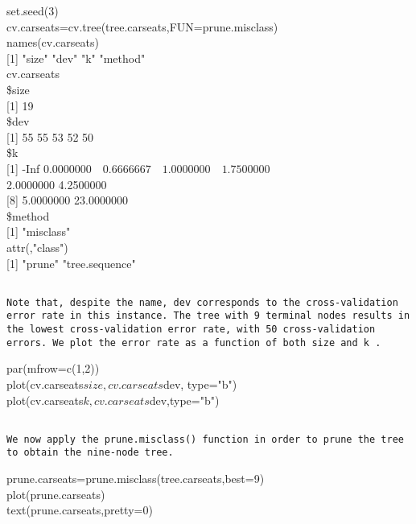 \documentclass[10pt]{article}
\begin{document}
\begin{displayquote}
set.seed(3)\\
cv.carseats=cv.tree(tree.carseats,FUN=prune.misclass)\\
names(cv.carseats)\\[0pt]
[1] "size" "dev" "k" "method"\\
cv.carseats\\
\$size\\[0pt]
[1] 19\\
\$dev\\[0pt]
[1] 55 55 53 52 50\\
\$k\\[0pt]
[1] -Inf $0.0000000 \quad 0.6666667 \quad 1.0000000 \quad 1.7500000$\\
2.0000000 4.2500000\\[0pt]
[8] 5.0000000 23.0000000\\
\$method\\[0pt]
[1] "misclass"\\
attr(,"class")\\[0pt]
[1] "prune" "tree.sequence"
\end{displayquote}

\begin{verbatim}

Note that, despite the name, dev corresponds to the cross-validation error rate in this instance. The tree with 9 terminal nodes results in the lowest cross-validation error rate, with 50 cross-validation errors. We plot the error rate as a function of both size and k .
\end{verbatim}

\begin{displayquote}
par(mfrow=c(1,2))\\
plot(cv.carseats$size,cv.carseats$dev, type="b")\\
plot(cv.carseats$k,cv.carseats$dev,type="b")

\end{displayquote}

\begin{verbatim}

We now apply the prune.misclass() function in order to prune the tree to obtain the nine-node tree.
\end{verbatim}

\begin{displayquote}
prune.carseats=prune.misclass(tree.carseats,best=9)\\
plot(prune.carseats)\\
text(prune.carseats,pretty=0)
\end{displayquote}
\end{document}
